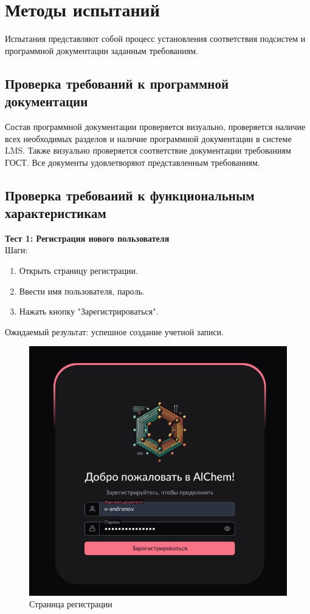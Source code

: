 \documentclass[a4paper,12pt,reqno]{article}
\begin{document}
    \newpage

    \section{Методы испытаний}
    Испытания представляют собой процесс установления соответствия подсистем и программной документации заданным требованиям.

    \subsection{Проверка требований к программной документации}
    Состав программной документации проверяется визуально, проверяется наличие всех необходимых разделов и наличие программной документации в системе LMS. Также визуально проверяется соответствие документации требованиям ГОСТ. Все документы удовлетворяют представленным требованиям.

    \subsection{Проверка требований к функциональным характеристикам}

    \textbf{Тест 1: Регистрация нового пользователя}\\
    Шаги:
    \begin{enumerate}
        \item Открыть страницу регистрации.
        \item Ввести имя пользователя, пароль.
        \item Нажать кнопку "Зарегистрироваться".
    \end{enumerate}
    Ожидаемый результат: успешное создание учетной записи.

    \begin{figure}[H]
        \centering
        \includegraphics[width=0.5\linewidth]{img/signup.png}
        \caption{Страница регистрации}
    \end{figure}
    \vspace{0.6cm}
\end{document}
